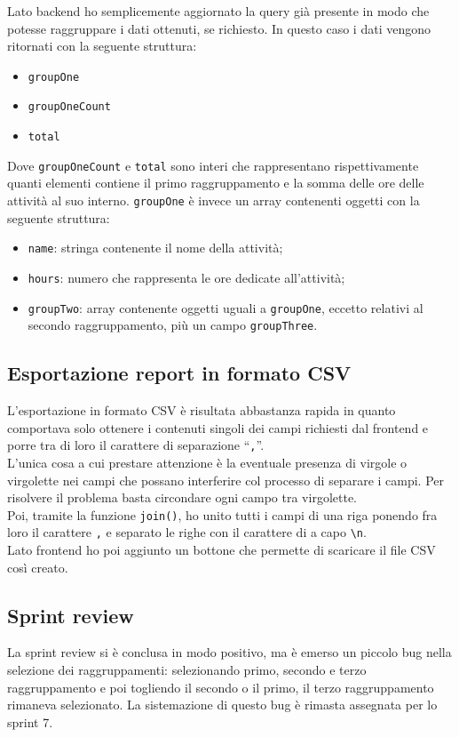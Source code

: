 Lato backend ho semplicemente aggiornato la query già presente in modo che potesse raggruppare i dati ottenuti, se richiesto. In questo caso i dati vengono ritornati con la seguente struttura:
\begin{itemize}
  \item \texttt{groupOne}
  \item \texttt{groupOneCount}
  \item \texttt{total}
\end{itemize}
Dove \texttt{groupOneCount} e \texttt{total} sono interi che rappresentano rispettivamente quanti elementi contiene il primo raggruppamento e la somma delle ore delle attività al suo interno.
\texttt{groupOne} è invece un array contenenti oggetti con la seguente struttura:
\begin{itemize}
  \item \texttt{name}: stringa contenente il nome della attività;
  \item \texttt{hours}: numero che rappresenta le ore dedicate all'attività;
  \item \texttt{groupTwo}: array contenente oggetti uguali a \texttt{groupOne}, eccetto relativi al secondo raggruppamento, più un campo \texttt{groupThree}.
\end{itemize}

\subsection{Esportazione report in formato CSV}
L'esportazione in formato CSV è risultata abbastanza rapida in quanto comportava solo ottenere i contenuti singoli dei campi richiesti dal frontend e porre tra di loro il carattere di separazione ``\texttt{,}''.\\
L'unica cosa a cui prestare attenzione è la eventuale presenza di virgole o virgolette nei campi che possano interferire col processo di separare i campi.
Per risolvere il problema basta circondare ogni campo tra virgolette.\\
Poi, tramite la funzione \texttt{join()}, ho unito tutti i campi di una riga ponendo fra loro il carattere \texttt{,} e separato le righe con il carattere di a capo \texttt{\textbackslash n}.\\
Lato frontend ho poi aggiunto un bottone che permette di scaricare il file CSV così creato.

\subsection{Sprint review}
La sprint review si è conclusa in modo positivo, ma è emerso un piccolo bug nella selezione dei raggruppamenti: selezionando primo, secondo e terzo raggruppamento e poi togliendo il secondo o il primo, il terzo raggruppamento rimaneva selezionato. La sistemazione di questo bug è rimasta assegnata per lo sprint 7.